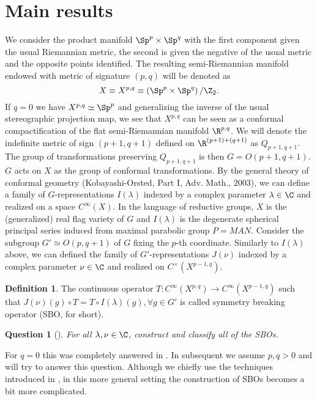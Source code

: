 \documentclass[10pt]{article} %
\newtheorem{question}{Question}
\theoremstyle{definition}
\newtheorem{definition}{Definition}
\begin{document}
\section{Main results}
We consider the product manifold $\Sp^p\times\Sp^q$ with the first component given the usual Riemannian metric, the second is given the negative of the usual metric
and the opposite points identified. The resulting semi-Riemannian manifold endowed with metric of signature $(p,q)$ will be denoted as\begin{equation*}
	X\equiv X^{p,q}\equiv \left( \Sp^p\times\Sp^q \right)/\Z_2.
\end{equation*}
If $q=0$ we have $X^{p,q}\simeq \Sp^p$ and generalizing the inverse of the usual stereographic projection map, we see that $X^{p,q}$ can be seen as a conformal
compactification of the flat semi-Riemannian manifold $\R^{p,q}$. We will denote the indefinite metric of sign $(p+1,q+1)$ defined on $\R^{\left( p+1 \right)+\left( q+1 \right)}$
as $Q_{p+1,q+1}$. The group of transformations preserving $Q_{p+1,q+1}$ is then $G=O(p+1,q+1)$. $G$ acts on $X$ as the group of conformal transformations.
By the general theory of conformal geometry (Kobayashi-Orsted, Part I, Adv. Math., 2003), we can define a family of $G$-representations $I(\lambda)$ indexed by a complex
parameter $\lambda\in\C$ and realized on a space $C^\infty(X)$. In the language of reductive groups, $X$ is the (generalized) real flag variety of $G$ and $I(\lambda)$ is the
degenerate spherical principal series induced from maximal parabolic group $P=MAN$. Consider the subgroup $G'\simeq O(p,q+1)$ of $G$ fixing the $p$-th coordinate. Similarly to
$I(\lambda)$ above, we can defined the family of $G'$-representations $J(\nu)$ indexed by a complex parameter $\nu\in\C$ and realized on $C^\times(X^{p-1,q})$.
\begin{definition}
	The continuous operator $T:C^\infty(X^{p,q})\to C^\infty(X^{p-1,q})$ such that $J(\nu)(g)\circ T=T\circ I(\lambda)(g),\forall g\in G'$ is called
	symmetry breaking operator (SBO, for short).
\end{definition}
\begin{question}[{\cite{kobayashi2015symmetry}}]
	For all $\lambda,\nu\in\C$, construct and classify all of the SBOs.
\end{question}
For $q=0$ this was completely answered in \cite{kobayashi2015symmetry}. In subsequent we assume $p,q>0$ and will try to answer this question.
Although we chiefly use the techniques introduced in \cite{kobayashi2015symmetry}, in this more general setting the construction of SBOs becomes a bit more complicated.
\end{document}
